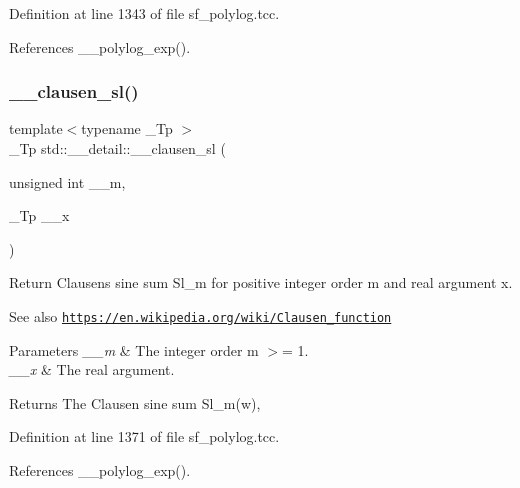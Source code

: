 Definition at line 1343 of file sf\+\_\+polylog.\+tcc.



References \+\_\+\+\_\+polylog\+\_\+exp().

\mbox{\label{namespacestd_1_1____detail_a554bb352d6397ea5991400eb3734165f}} 
\subsubsection{\texorpdfstring{\+\_\+\+\_\+clausen\+\_\+sl()}{\_\_clausen\_sl()}\hspace{0.1cm}{\footnotesize\ttfamily [2/2]}}
{\footnotesize\ttfamily template$<$typename \+\_\+\+Tp $>$ \\
\+\_\+\+Tp std\+::\+\_\+\+\_\+detail\+::\+\_\+\+\_\+clausen\+\_\+sl (\begin{DoxyParamCaption}\item[{unsigned int}]{\+\_\+\+\_\+m,  }\item[{\+\_\+\+Tp}]{\+\_\+\+\_\+x }\end{DoxyParamCaption})}

Return Clausen\textquotesingle{}s sine sum Sl\+\_\+m for positive integer order m and real argument x. \begin{DoxySeeAlso}{See also}
\href{https://en.wikipedia.org/wiki/Clausen_function}{\tt https\+://en.\+wikipedia.\+org/wiki/\+Clausen\+\_\+function}
\end{DoxySeeAlso}

\begin{DoxyParams}{Parameters}
{\em \+\_\+\+\_\+m} & The integer order m $>$= 1. \\
\hline
{\em \+\_\+\+\_\+x} & The real argument. \\
\hline
\end{DoxyParams}
\begin{DoxyReturn}{Returns}
The Clausen sine sum Sl\+\_\+m(w), 
\end{DoxyReturn}


Definition at line 1371 of file sf\+\_\+polylog.\+tcc.



References \+\_\+\+\_\+polylog\+\_\+exp().

\mbox{\label{namespacestd_1_1____detail_a7b23bcf7e9f20b1e353a047126e13af1}} 
